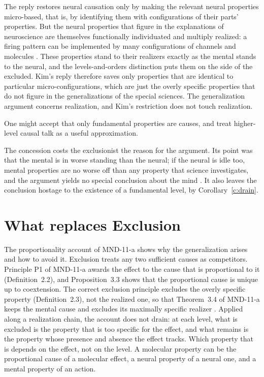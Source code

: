 \documentclass{situationist-preprint}
\begin{document}
\begin{reply}
The reply restores neural causation only by making the relevant neural properties micro-based, that is, by identifying them with configurations of their parts' properties. But the neural properties that figure in the explanations of neuroscience are themselves functionally individuated and multiply realized: a firing pattern can be implemented by many configurations of channels and molecules \citep{Block2003}. These properties stand to their realizers exactly as the mental stands to the neural, and the levels-and-orders distinction puts them on the side of the excluded. Kim's reply therefore saves only properties that are identical to particular micro-configurations, which are just the overly specific properties that do not figure in the generalizations of the special sciences. The generalization argument concerns realization, and Kim's restriction does not touch realization.
\end{reply}

\begin{objection}
One might accept that only fundamental properties are causes, and treat higher-level causal talk as a useful approximation.
\end{objection}

\begin{reply}
The concession costs the exclusionist the reason for the argument. Its point was that the mental is in worse standing than the neural; if the neural is idle too, mental properties are no worse off than any property that science investigates, and the argument yields no special conclusion about the mind \citep{Bennett2003}. It also leaves the conclusion hostage to the existence of a fundamental level, by Corollary~\ref{c:drain}.
\end{reply}

\section{What replaces Exclusion}

The proportionality account of MND-11-a shows why the generalization arises and how to avoid it. Exclusion treats any two sufficient causes as competitors. Principle P1 of MND-11-a awards the effect to the cause that is proportional to it (Definition~2.2), and Proposition~3.3 shows that the proportional cause is unique up to coextension. The correct exclusion principle excludes the overly specific property (Definition~2.3), not the realized one, so that Theorem~3.4 of MND-11-a keeps the mental cause and excludes its maximally specific realizer \citep{Yablo1992,ListMenzies2009}. Applied along a realization chain, the account does not drain: at each level, what is excluded is the property that is too specific for the effect, and what remains is the property whose presence and absence the effect tracks. Which property that is depends on the effect, not on the level. A molecular property can be the proportional cause of a molecular effect, a neural property of a neural one, and a mental property of an action.
\end{document}
